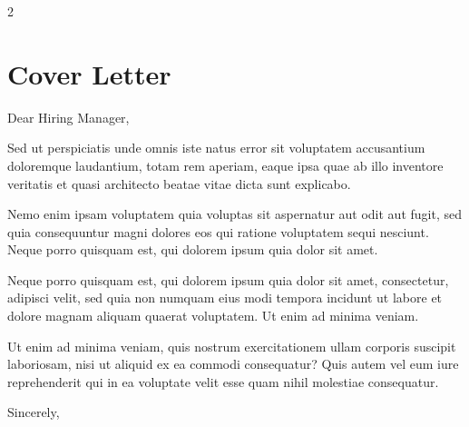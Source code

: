 \documentclass[11pt,a4paper]{article}
\begin{document}


\renderprofileheader

\vspace{0.55em}

\setlength{\columnsep}{1.05cm}
\setlength{\columnseprule}{0.45pt}
\begin{paracol}{2}

\section{Cover Letter}

Dear Hiring Manager,

Sed ut perspiciatis unde omnis iste natus error sit voluptatem accusantium doloremque laudantium, totam rem aperiam, eaque ipsa quae ab illo inventore veritatis et quasi architecto beatae vitae dicta sunt explicabo.

Nemo enim ipsam voluptatem quia voluptas sit aspernatur aut odit aut fugit, sed quia consequuntur magni dolores eos qui ratione voluptatem sequi nesciunt. Neque porro quisquam est, qui dolorem ipsum quia dolor sit amet.

Neque porro quisquam est, qui dolorem ipsum quia dolor sit amet, consectetur, adipisci velit, sed quia non numquam eius modi tempora incidunt ut labore et dolore magnam aliquam quaerat voluptatem. Ut enim ad minima veniam.

Ut enim ad minima veniam, quis nostrum exercitationem ullam corporis suscipit laboriosam, nisi ut aliquid ex ea commodi consequatur? Quis autem vel eum iure reprehenderit qui in ea voluptate velit esse quam nihil molestiae consequatur.

\vspace{0.9em}
Sincerely,\par
\vspace{0.8em}
{\bfseries \ProfileName}\par
\smallmuted{\ProfileTitle}

\switchcolumn

\par
\vspace{0.25em}
\par

\vspace{0.9em}
\par
\vspace{0.25em}
{\bfseries \ProfileName}\par
\smallmuted{\ProfileTitle}\par
\smallmuted{\ProfileAddress}\par

\vspace{0.9em}
\par
\vspace{0.25em}
\smallmuted{\today}

\end{paracol}
\end{document}
